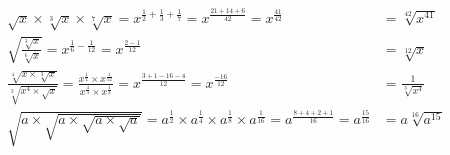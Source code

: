 \documentclass[a4paper,12pt]{article}
\begin{document}
\subsection{} %

\begin{align*}
\sqrt{x} \times \sqrt[3]{x} \times \sqrt[7]{x}
= x^{\frac{1}{2} + \frac{1}{3} + \frac{1}{7}}
= x^{\frac{21 + 14 + 6}{42}}
= x^{\frac{41}{42}}
&= \sqrt[42]{x^{41}} \\[6pt]
\sqrt{\frac{\sqrt[3]{x}}{\sqrt[6]{x}}}
= x^{\frac{1}{6} - \frac{1}{12}}
= x^{\frac{2 - 1}{12}}
&= \sqrt[12]{x} \\[6pt]
\frac{\sqrt[4]{x \times \sqrt[3]{x}}}{\sqrt[3]{x^4 \times \sqrt{x}}}
= \frac{x^{\frac{1}{4}} \times x^{\frac{1}{12}}}{x^{\frac{4}{3}} \times x^{\frac{1}{3}}} 
= x^{\frac{3 + 1 - 16 - 4}{12}}
= x^{\frac{-16}{12}}
&= \frac{1}{\sqrt[3]{x^4}} \\[6pt]
\sqrt{a \times \sqrt{a \times \sqrt{a \times \sqrt{a}}}}
= a^{\frac{1}{2}} \times a^{\frac{1}{4}} \times a^{\frac{1}{8}} \times a^{\frac{1}{16}}
= a^{\frac{8 + 4 + 2 + 1}{16}}
= a^{\frac{15}{16}}
&= a\sqrt[16]{a^{15}}
\end{align*}
\end{document}
